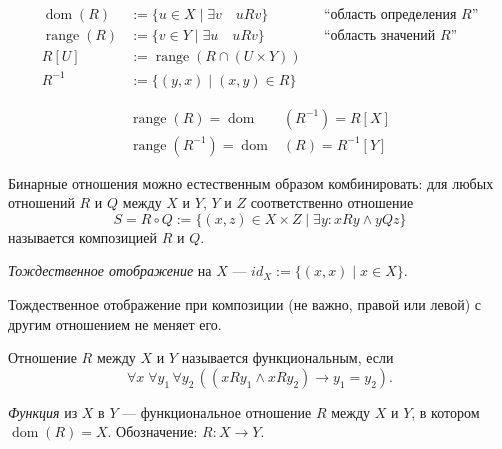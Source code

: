 \documentclass[12pt,a4paper]{article}
\DeclareMathOperator{\dom}{dom}
\DeclareMathOperator{\range}{range}
\begin{document}
    \begin{definition}
        \begin{align*}
            \dom(R) &:= \{u \in X \mid \exists v\quad uRv\}&& \text{``область определения $R$''}\\
            \range(R) &:= \{v \in Y \mid \exists u\quad uRv\}&& \text{``область значений $R$''}\\
            R[U] &:= \range(R \cap (U \times Y))\\
            R^{-1} &:= \{(y, x) \mid (x, y) \in R\}
        \end{align*}
    \end{definition}

    \begin{remark}
        \begin{align*}
            \range(R) = \dom&(R^{-1}) = R[X]\\
            \range(R^{-1}) = \dom&(R) = R^{-1}[Y]
        \end{align*}
    \end{remark}

    \begin{definition}
        Бинарные отношения можно естественным образом комбинировать: для любых отношений $R$ и $Q$ между $X$ и $Y$, $Y$ и $Z$ соответственно отношение
        \[
            S = R \circ Q := \{(x, z) \in X \times Z \mid \exists y: xRy \wedge yQz\}
        \]
        называется композицией $R$ и $Q$.
    \end{definition}

    \begin{definition}
        \emph{Тождественное отображение} на $X$ --- $id_X := \{(x, x) \mid x \in X\}$.
    \end{definition}

    \begin{remark}
        Тождественное отображение при композиции (не важно, правой или левой) с другим отношением не меняет его. 
    \end{remark}

    \begin{definition}
        Отношение $R$ между $X$ и $Y$ называется функциональным, если
        \[
            \forall x\; \forall y_1\, \forall y_2\, ((xRy_1 \wedge xRy_2) \rightarrow y_1 = y_2).
        \]
    \end{definition}

    \begin{definition}
        \emph{Функция} из $X$ в $Y$ --- функциональное отношение $R$ между $X$ и $Y$, в котором $\dom(R)=X$. Обозначение: $R: X \to Y$.
    \end{definition}
\end{document}
